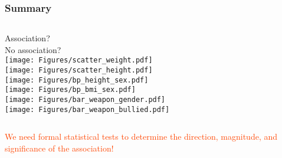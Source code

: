 \begin{frame}
\frametitle{Summary}
\begin{columns}
\vskip10pt
Association? \\
\vskip40pt
No association?
\\
\texttt{[image: Figures/scatter\_weight.pdf]}\\
\texttt{[image: Figures/scatter\_height.pdf]}
\\
\texttt{[image: Figures/bp\_height\_sex.pdf]}\\
\texttt{[image: Figures/bp\_bmi\_sex.pdf]}
\\
\texttt{[image: Figures/bar\_weapon\_gender.pdf]}\\
\texttt{[image: Figures/bar\_weapon\_bullied.pdf]}
\end{columns}
\begin{center}
\textcolor{OrangeRed}{We need formal statistical tests to determine the direction, magnitude, and significance of the association!}
\end{center}
\end{frame}


